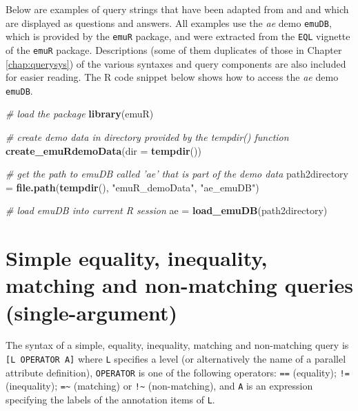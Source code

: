 \documentclass[]{book}
\newenvironment{Shaded}{\begin{snugshade}}{\end{snugshade}}
\newcommand{\CommentTok}[1]{\textcolor[rgb]{0.56,0.35,0.01}{\textit{#1}}}
\newcommand{\DataTypeTok}[1]{\textcolor[rgb]{0.13,0.29,0.53}{#1}}
\newcommand{\KeywordTok}[1]{\textcolor[rgb]{0.13,0.29,0.53}{\textbf{#1}}}
\newcommand{\NormalTok}[1]{#1}
\newcommand{\StringTok}[1]{\textcolor[rgb]{0.31,0.60,0.02}{#1}}
\begin{document}
Below are examples of query strings that have been adapted from \citet{cassidy:sc2001a} and \citet{harrington:2002aa} and which are displayed as questions and answers. All examples use the \emph{ae} demo \texttt{emuDB}, which is provided by the \texttt{emuR} package, and were extracted from the \texttt{EQL} vignette of the \texttt{emuR} package. Descriptions (some of them duplicates of those in Chapter \ref{chap:querysys}) of the various syntaxes and query components are also included for easier reading. The R code snippet below shows how to access the \emph{ae} demo \texttt{emuDB}.

\begin{Shaded}
\begin{Highlighting}[]
\CommentTok{# load the package }
\KeywordTok{library}\NormalTok{(emuR)}

\CommentTok{# create demo data in directory provided by the tempdir() function}
\KeywordTok{create_emuRdemoData}\NormalTok{(}\DataTypeTok{dir =} \KeywordTok{tempdir}\NormalTok{())}

\CommentTok{# get the path to emuDB called 'ae' that is part of the demo data}
\NormalTok{path2directory =}\StringTok{ }\KeywordTok{file.path}\NormalTok{(}\KeywordTok{tempdir}\NormalTok{(), }\StringTok{"emuR_demoData"}\NormalTok{, }\StringTok{"ae_emuDB"}\NormalTok{)}

\CommentTok{# load emuDB into current R session}
\NormalTok{ae =}\StringTok{ }\KeywordTok{load_emuDB}\NormalTok{(path2directory)}
\end{Highlighting}
\end{Shaded}

\hypertarget{simple-equality-inequality-matching-non-matching-queries-single-argument}{%
\section{Simple equality, inequality, matching and non-matching queries (single-argument)}\label{simple-equality-inequality-matching-non-matching-queries-single-argument}}

The syntax of a simple, equality, inequality, matching and non-matching query is \texttt{{[}L\ OPERATOR\ A{]}} where \texttt{L} specifies a level (or alternatively the name of a parallel attribute definition), \texttt{OPERATOR} is one of the following operators: \texttt{==} (equality); \texttt{!=} (inequality); \texttt{=\textasciitilde{}} (matching) or \texttt{!\textasciitilde{}} (non-matching), and \texttt{A} is an expression specifying the labels of the annotation items of \texttt{L}.
\end{document}
